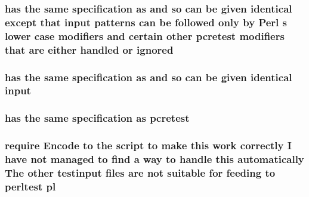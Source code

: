 \subsubsection[{\texorpdfstring{ignored}{ignored}}]{ has the same specification {\bf as} and {\bf so} {\bf can} {\bf be} {\bf given} {\bf identical} {\bf except} that {\bf input} {\bf patterns} {\bf can} {\bf be} followed only by {\bf Perl} {\bf s} lower {\bf case} {\bf modifiers} and certain other {\bf pcretest} {\bf modifiers} that {\bf are} either handled {\bf or} ignored}\hypertarget{perltest_8txt_a832f3364a14e5d2ec955e936dab888e6}{}\label{perltest_8txt_a832f3364a14e5d2ec955e936dab888e6}
\subsubsection[{\texorpdfstring{input}{input}}]{ has the same specification {\bf as} and {\bf so} {\bf can} {\bf be} {\bf given} {\bf identical} input}\hypertarget{perltest_8txt_a1d3f4df61ab6d72e9cfd2de361e2a85b}{}\label{perltest_8txt_a1d3f4df61ab6d72e9cfd2de361e2a85b}
\subsubsection[{\texorpdfstring{pcretest}{pcretest}}]{ has the same specification {\bf as} pcretest}\hypertarget{perltest_8txt_ad7e2e1cbcf5aed569f45ce5270eaf0d0}{}\label{perltest_8txt_ad7e2e1cbcf5aed569f45ce5270eaf0d0}
\subsubsection[{\texorpdfstring{pl}{pl}}]{\setlength{\rightskip}{0pt plus 5cm}require Encode {\bf to} the {\bf script} {\bf to} {\bf make} {\bf this} work correctly {\bf I} have {\bf not} managed {\bf to} find {\bf a} {\bf way} {\bf to} {\bf handle} {\bf this} automatically The other testinput {\bf files} {\bf are} {\bf not} suitable for feeding {\bf to} perltest pl}\hypertarget{perltest_8txt_a841c59daab01e1f609fdd4547afbe6e6}{}\label{perltest_8txt_a841c59daab01e1f609fdd4547afbe6e6}
